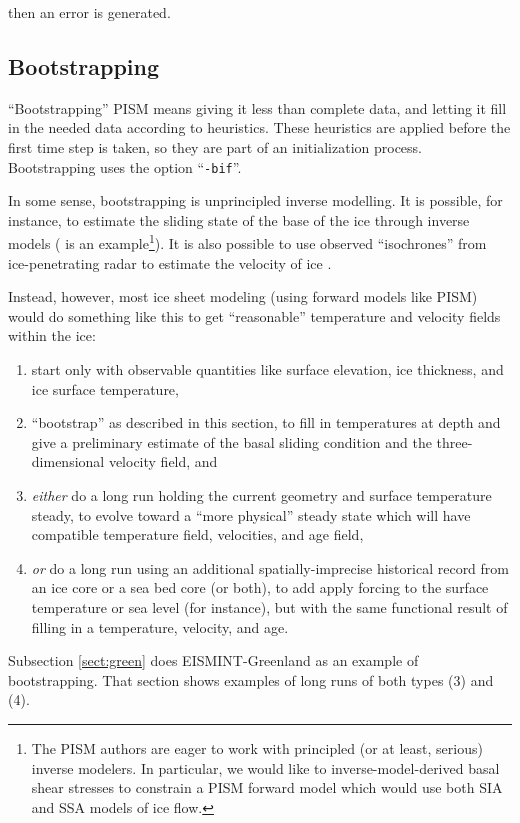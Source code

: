 \documentclass[11pt,final]{amsart}
\begin{document}
\noindent then an error is generated.


\subsection{Bootstrapping}  ``Bootstrapping'' PISM means giving it less than complete data, and letting it fill in the needed data according to heuristics.  These heuristics are applied before the first time step is taken, so they are part of an initialization process.  Bootstrapping uses the option ``\verb|-bif|''.

In some sense, bootstrapping is unprincipled inverse modelling.  It is possible, for instance, to estimate the sliding state of the base of the ice through inverse models (\cite{JoughinMacAyealTulaczyk} is an example\footnote{The PISM authors are eager to work with principled (or at least, serious) inverse modelers.  In particular, we would like to inverse-model-derived basal shear stresses to constrain a PISM forward model which would use both SIA and SSA models of ice flow.}).  It is also possible to use observed ``isochrones'' from ice-penetrating radar to estimate the velocity of ice \cite{Eisen06draft}.

Instead, however, most ice sheet modeling (using forward models like PISM) would do something like this to get ``reasonable'' temperature and velocity fields within the ice: \begin{enumerate}
\item start only with observable quantities like surface elevation, ice thickness, and ice surface temperature,
\item ``bootstrap'' as described in this section, to fill in temperatures at depth and give a preliminary estimate of the basal sliding condition and the three-dimensional velocity field, and
\item \emph{either} do a long run holding the current geometry and surface temperature steady,  to evolve toward a ``more physical'' steady state which will have compatible temperature field, velocities, and age field,
\item \emph{or} do a long run using an additional spatially-imprecise historical record from an ice core or a sea bed core (or both), to add apply forcing to the surface temperature or sea level (for instance), but with the same functional result of filling in a temperature, velocity, and age.
\end{enumerate}

Subsection \ref{sect:green} does EISMINT-Greenland \cite{RitzEISMINT,HuybrechtsEISMINT} as an example of bootstrapping.  That section shows examples of long runs of both types (3) and (4).
\end{document}
